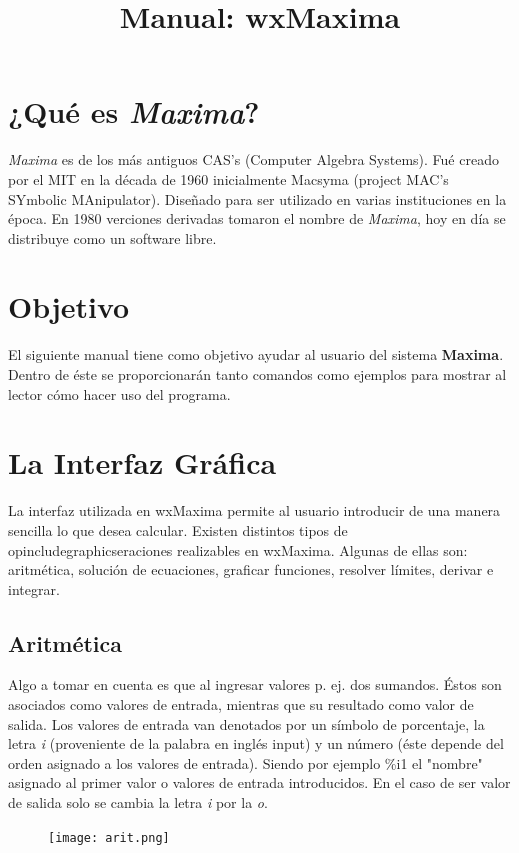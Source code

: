 \documentclass{article}
\title{Manual: wxMaxima}
\begin{document}
\maketitle
\tableofcontents
\section{¿Qué es \textit{Maxima}?}
\textit{Maxima} es de los más antiguos CAS's (Computer Algebra Systems). Fué creado por el MIT en la década de 1960 inicialmente Macsyma (project MAC's SYmbolic MAnipulator). Diseñado para ser utilizado en varias instituciones en la época. En 1980 verciones derivadas tomaron el nombre de \textit{Maxima}, hoy en día se distribuye como un software libre.
\section{Objetivo}
El siguiente manual tiene como objetivo ayudar al usuario del sistema \textbf{Maxima}. Dentro de éste se proporcionarán tanto comandos como ejemplos para mostrar al lector cómo hacer uso del programa.
\section{La Interfaz Gráfica}
La interfaz utilizada en wxMaxima permite al usuario introducir de una manera sencilla lo que desea calcular. Existen distintos tipos de opincludegraphicseraciones realizables en wxMaxima. Algunas de ellas son: aritmética, solución de ecuaciones, graficar funciones, resolver límites, derivar e integrar.
\subsection{Aritmética}
Algo a tomar en cuenta es que al ingresar valores p. ej. dos sumandos. Éstos son asociados como valores de entrada, mientras que su resultado como valor de salida. Los valores de entrada van denotados por un símbolo de porcentaje, la letra \textit{i} (proveniente de la palabra en inglés input) y un número (éste depende del orden asignado a los valores de entrada). Siendo por ejemplo \%i1 el "nombre" asignado al primer valor o valores de entrada introducidos. En el caso de ser valor de salida solo se cambia la letra \textit{i} por la \textit{o}.\\

	\begin{figure}[H]
		\centering
        \texttt{[image: arit.png]}
	\end{figure} 
 
\end{document}
